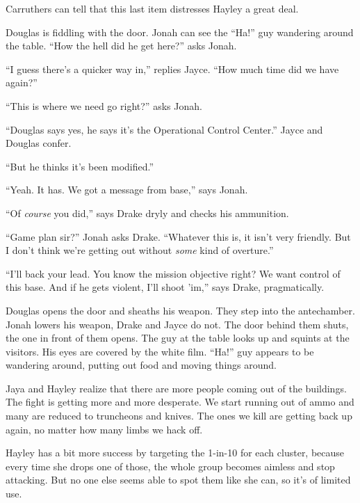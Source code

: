 Carruthers can tell that this last item distresses Hayley a great deal.





Douglas is fiddling with the door.  Jonah can see the ``Ha!'' guy wandering around the table.  ``How the hell did he get here?'' asks Jonah.

``I guess there's a quicker way in,'' replies Jayce.  ``How much time did we have again?''

``This is where we need go right?'' asks Jonah.

``Douglas says yes, he says it's the Operational Control Center.''  Jayce and Douglas confer.

``But he thinks it's been modified.''

``Yeah.  It has.  We got a message from base,'' says Jonah.

``Of \textit{course} you did,'' says Drake dryly and checks his ammunition.

``Game plan sir?'' Jonah asks Drake.  ``Whatever this is, it isn't very friendly.  But I don't think we're getting out without \textit{some} kind of overture.''

``I'll back your lead.  You know the mission objective right?  We want control of this base.  And if he gets violent, I'll shoot 'im,'' says Drake, pragmatically.



Douglas opens the door and sheaths his weapon.  They step into the antechamber.   Jonah lowers his weapon, Drake and Jayce do not.  The door behind them shuts, the one in front of them opens.  The guy at the table looks up and squints at the visitors.  His eyes are covered by the white film.  ``Ha!'' guy appears to be wandering around, putting out food and moving things around.


\newpage


Jaya and Hayley realize that there are more people coming out of the buildings.   The fight is getting more and more desperate.  We start running out of ammo and many are reduced to truncheons and knives.  The ones we kill are getting back up again, no matter how many limbs we hack off. 



Hayley has a bit more success by targeting the 1-in-10 for each cluster, because every time she drops one of those, the whole group becomes aimless and stop attacking.  But no one else seems able to spot them like she can, so it's of limited use.



